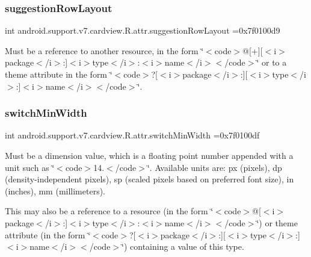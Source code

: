 \subsubsection{\texorpdfstring{suggestion\+Row\+Layout}{suggestionRowLayout}}
{\footnotesize\ttfamily int android.\+support.\+v7.\+cardview.\+R.\+attr.\+suggestion\+Row\+Layout =0x7f0100d9\hspace{0.3cm}{\ttfamily [static]}}

Must be a reference to another resource, in the form \char`\"{}$<$code$>$@\mbox{[}+\mbox{]}\mbox{[}$<$i$>$package$<$/i$>$\+:\mbox{]}$<$i$>$type$<$/i$>$\+:$<$i$>$name$<$/i$>$$<$/code$>$\char`\"{} or to a theme attribute in the form \char`\"{}$<$code$>$?\mbox{[}$<$i$>$package$<$/i$>$\+:\mbox{]}\mbox{[}$<$i$>$type$<$/i$>$\+:\mbox{]}$<$i$>$name$<$/i$>$$<$/code$>$\char`\"{}. \mbox{\label{classandroid_1_1support_1_1v7_1_1cardview_1_1R_1_1attr_a708e67b59363818ee7852db665efd30d}} 
\subsubsection{\texorpdfstring{switch\+Min\+Width}{switchMinWidth}}
{\footnotesize\ttfamily int android.\+support.\+v7.\+cardview.\+R.\+attr.\+switch\+Min\+Width =0x7f0100df\hspace{0.3cm}{\ttfamily [static]}}

Must be a dimension value, which is a floating point number appended with a unit such as \char`\"{}$<$code$>$14.\+5sp$<$/code$>$\char`\"{}. Available units are\+: px (pixels), dp (density-\/independent pixels), sp (scaled pixels based on preferred font size), in (inches), mm (millimeters). 

This may also be a reference to a resource (in the form \char`\"{}$<$code$>$@\mbox{[}$<$i$>$package$<$/i$>$\+:\mbox{]}$<$i$>$type$<$/i$>$\+:$<$i$>$name$<$/i$>$$<$/code$>$\char`\"{}) or theme attribute (in the form \char`\"{}$<$code$>$?\mbox{[}$<$i$>$package$<$/i$>$\+:\mbox{]}\mbox{[}$<$i$>$type$<$/i$>$\+:\mbox{]}$<$i$>$name$<$/i$>$$<$/code$>$\char`\"{}) containing a value of this type. \mbox{\label{classandroid_1_1support_1_1v7_1_1cardview_1_1R_1_1attr_a8b6e45488aae7078a0791f1fbe6229a1}} 
